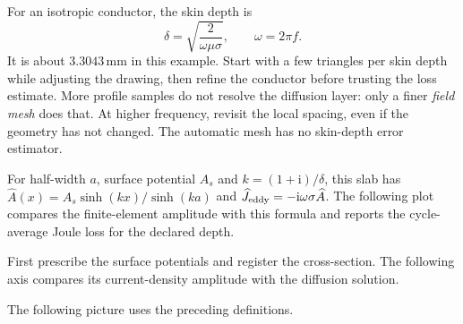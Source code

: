 For an isotropic conductor, the skin depth is
\[
 \delta=\sqrt{\frac{2}{\omega\mu\sigma}},\qquad \omega=2\pi f.
\]
It is about $3.3043\,\mathrm{mm}$ in this example. Start with a few
triangles per skin depth while adjusting the drawing, then refine the
conductor before trusting the loss estimate. More profile samples do not
resolve the diffusion layer: only a finer \emph{field mesh} does that.
At higher frequency, revisit the local spacing, even if the geometry
has not changed. The automatic mesh has no skin-depth error estimator.

For half-width $a$, surface potential $A_s$ and $k=(1+\mathrm{i})/\delta$,
this slab has $\widehat A(x)=A_s\sinh(kx)/\sinh(ka)$ and
$\widehat J_{\rm eddy}=-\mathrm{i}\omega\sigma\widehat A$.
The following plot compares the finite-element amplitude with this formula
and reports the cycle-average Joule loss for the declared depth.

First prescribe the surface potentials and register the cross-section. The following axis compares its current-density amplitude with the diffusion solution.


\begin{codeexample}
\end{codeexample}

The following picture uses the preceding definitions.


\begin{codeexample}[width=0pt]
\end{codeexample}

